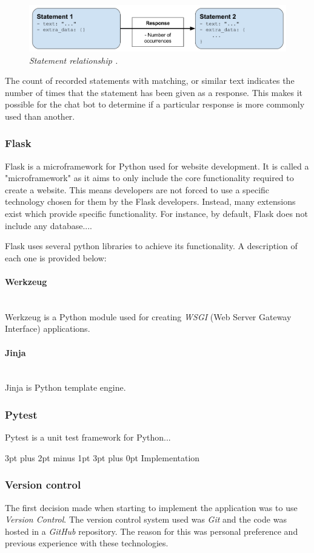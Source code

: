 \documentclass[12pt,a4paper]{article}
\makeatletter
\newcommand{\myparagraph}[1]{\paragraph{#1}\mbox{}\\}
\renewcommand\subsection{\@startsection {subsection}{1}{2mm} %
                                        {3pt plus 2pt minus 1pt} %
                                        {3pt plus 0pt} %
                                        {\normalfont\bfseries}}
\newcommand{\captionstyle}[1] {
    \small{\textit{#1}}
}
\makeatother
\begin{document}
\begin{figure}[!htb]%
    \centering
    \includegraphics[width=1.0\columnwidth]{statement-relationship}%
    \caption{\captionstyle{Statement relationship \cite{Chatterbot:online}.}}%
    \label{fig:statement-relationship}%
\end{figure}

The count of recorded statements with matching, or similar text indicates the number of times that the statement has been given as a response. This makes it possible for the chat bot to determine if a particular response is more commonly used than another.

\subsubsection{Flask}
Flask is a microframework for Python used for website development. It is called a "microframework" as it aims to only include the core functionality required to create a website. This means developers are not forced to use a specific technology chosen for them by the Flask developers. Instead, many extensions exist which provide specific functionality. For instance, by default, Flask does not include any database....

Flask uses several python libraries to achieve its functionality. A description of each one is provided below:

\myparagraph{Werkzeug}
Werkzeug is a Python module used for creating \textit{WSGI} (Web Server Gateway Interface) applications. 

\myparagraph{Jinja}
Jinja is Python template engine. 

\subsubsection{Pytest}
Pytest is a unit test framework for Python...

\subsection{Implementation}
\subsubsection{Version control}
The first decision made when starting to implement the application was to use \textit{Version Control}. The version control system used was \textit{Git} and the code was hosted in a \textit{GitHub} repository. The reason for this was personal preference and previous experience with these technologies. 
\end{document}
